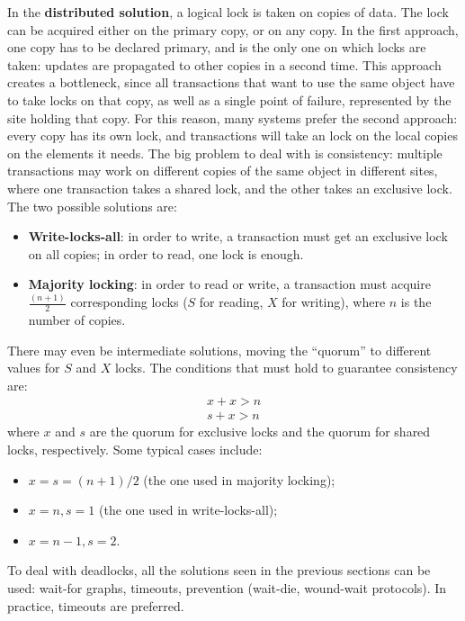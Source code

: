 In the \textbf{distributed solution}, a logical lock is taken on copies of data. The lock can be acquired either on the primary copy, or on any copy. In the first approach, one copy has to be declared primary, and is the only one on which locks are taken: updates are propagated to other copies in a second time. This approach creates a bottleneck, since all transactions that want to use the same object have to take locks on that copy, as well as a single point of failure, represented by the site holding that copy. For this reason, many systems prefer the second approach: every copy has its own lock, and transactions will take an lock on the local copies on the elements it needs. The big problem to deal with is consistency: multiple transactions may work on different copies of the same object in different sites, where one transaction takes a shared lock, and the other takes an exclusive lock. \\
The two possible solutions are:
\begin{itemize}
    \item \textbf{Write-locks-all}: in order to write, a transaction must get an exclusive lock on all copies; in order to read, one lock is enough.

    \item \textbf{Majority locking}: in order to read or write, a transaction must acquire $\frac{(n+1)}{2}$ corresponding locks ($S$ for reading, $X$ for writing), where $n$ is the number of copies.
\end{itemize}
There may even be intermediate solutions, moving the ``quorum'' to different values for $S$ and $X$ locks. The conditions that must hold to guarantee consistency are:
\begin{gather*}
    x + x > n \\
    s + x > n
\end{gather*}
where $x$ and $s$ are the quorum for exclusive locks and the quorum for shared locks, respectively. Some typical cases include:
\begin{itemize}
    \item $x = s = (n+1)/2$ (the one used in majority locking);
    \item $x=n, s=1$ (the one used in write-locks-all);
    \item $x=n-1, s=2$.
\end{itemize}

To deal with deadlocks, all the solutions seen in the previous sections can be used: wait-for graphs, timeouts, prevention (wait-die, wound-wait protocols). In practice, timeouts are preferred.